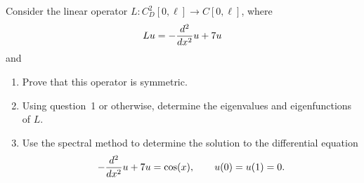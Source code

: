 Consider the linear operator $L:C_D^2[0,\ell] \to C[0,\ell]$, where
\[ L u = -{d^2 \over dx^2} u + 7u\]
and 

\begin{enumerate}
   \item Prove that this operator is symmetric.
   \item Using question~1 or otherwise, determine the
         eigenvalues and eigenfunctions of $L$.
   \item Use the spectral method to determine the solution to the
         differential equation
           \[ -{d^2 \over dx^2} u + 7 u = \cos(x), \qquad u(0)=u(1)=0.\]
\end{enumerate}



